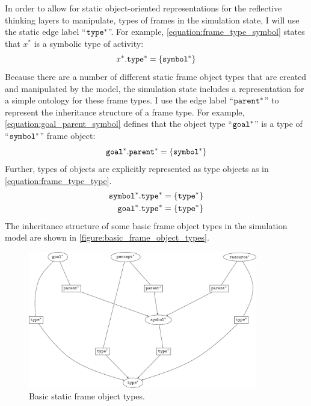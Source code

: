 In order to allow for static object-oriented representations for the
reflective thinking layers to manipulate, types of frames in the
simulation state, I will use the static edge label
``$\text{\tt{type}}^*$''.  For example,
{\mbox{\autoref{equation:frame_type_symbol}}} states that $x^*$ is a
symbolic type of activity:
\begin{equation}
\label{equation:frame_type_symbol}
x^*.\text{\tt{type}}^* = \{\text{\tt{symbol}}^*\}
\end{equation}
Because there are a number of different static frame object types that
are created and manipulated by the model, the simulation state
includes a representation for a simple ontology for these frame types.
I use the edge label ``$\text{\tt{parent}}^*$'' to represent the
inheritance structure of a frame type.  For example,
{\mbox{\autoref{equation:goal_parent_symbol}}} defines that the object
type ``$\text{\tt{goal}}^*$'' is a type of ``$\text{\tt{symbol}}^*$''
frame object:
\begin{equation}
\label{equation:goal_parent_symbol}
  \text{\tt{goal}}^*.\text{\tt{parent}}^* = \{\text{\tt{symbol}}^*\}
\end{equation}
Further, types of objects are explicitly represented as type objects
as in {\mbox{\autoref{equation:frame_type_type}}}.
\begin{align}
\label{equation:frame_type_type}
  \text{\tt{symbol}}^*.\text{\tt{type}}^* &= \{\text{\tt{type}}^*\} \\
    \text{\tt{goal}}^*.\text{\tt{type}}^* &= \{\text{\tt{type}}^*\}
\end{align}
The inheritance structure of some basic frame object types in the
simulation model are shown in
{\mbox{\autoref{figure:basic_frame_object_types}}}.
\begin{figure}
\includegraphics[width=10cm]{gfx/basic_frame_object_types}
\caption{Basic static frame object types.}
\label{figure:basic_frame_object_types}
\end{figure}


